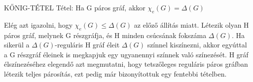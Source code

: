 \documentclass[]{article}
\begin{document}
\begin{framed}
KŐNIG-TÉTEL Tétel: Ha G páros gráf, akkor $\chi_e(G) = \Delta(G)$
\end{framed}
\begin{leftbar}
Elég azt igazolni, hogy $\chi_e(G) \leq \Delta(G)$ az előző állítás miatt. Létezik olyan H páros gráf, melynek G részgráfja, és H minden csúcsának fokszáma $\Delta(G)$. Ha sikerül a $\Delta(G)$-reguláris H gráf éleit $\Delta(G)$ színnel kiszínezni, akkor egyúttal a G részgráf éleinek is megkapjuk egy ugyanennyi színnek való színezését. H gráf élszínezéséhez elegendő azt megmutatni, hogy tetszőleges reguláris páros gráfban létezik teljes párosítás, ezt pedig már bizonyítottuk egy fentebbi tételben. 
\end{leftbar}
\end{document}
